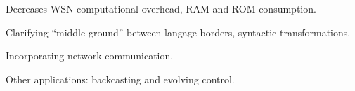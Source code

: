 Decreases WSN computational overhead, RAM and ROM consumption. 
\stopslide


\begin{citemize}
\item Clarifying ``middle ground'' between langage borders, syntactic transformations.
\item Incorporating network communication. 
\item Other applications: backcasting and evolving control.
\end{citemize}

\stopslide


\stopslide
